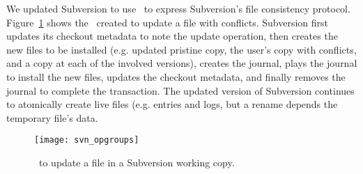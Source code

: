 We updated Subversion to use \opgroups\ to express Subversion's file
consistency protocol.
Figure~\ref{fig:svn-order} shows the \opgroups\ created to update a
file with conflicts.
%
Subversion first updates its checkout metadata to note the update
operation, then creates the new files to be installed (e.g. updated
pristine copy, the user's copy with conflicts, and a copy at each of
the involved versions), creates the journal, plays the journal to
install the new files, updates the checkout metadata, and finally
removes the journal to complete the transaction.
%
The updated version of Subversion continues to atomically create live
files (e.g. entries and logs, but a rename depends the temporary
file's data.

\begin{figure}[htb]
  \centering
  \texttt{[image: svn\_opgroups]}
  \caption{\Opgroups\ to update a file in a Subversion working copy.}
  \label{fig:svn-order}
\end{figure}
